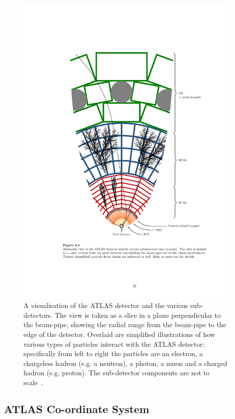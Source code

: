 \begin{figure}[!ht]
  \begin{center}
    \includegraphics[width=0.7\linewidth, angle=0]{figs/Detector/ATLAS_slice.pdf}
  \end{center}
  \caption[A visualisation of the ATLAS detector and the various sub-detectors with simplified illustrations of how various types of particles interact with the ATLAS detector overlaid.]
          {A visualisation of the ATLAS detector and the various sub-detectors.
    The view is taken as a slice in a plane perpendicular to the beam-pipe,
    showing the radial range from the beam-pipe to the edge of the detector.
    Overlaid are simplified illustrations of how various types of particles interact with the ATLAS detector;
    specifically from left to right the particles are an electron, a chargeless hadron (e.g. a neutron), a photon, a muon and a charged hadron (e.g. proton).
    The sub-detector components are not to scale~\cite{det-thesis_gutchow}.}
  \label{fig:det-ATLAS_slice}
\end{figure}

\subsection{ATLAS Co-ordinate System}
\label{sec:det-coordinate}

